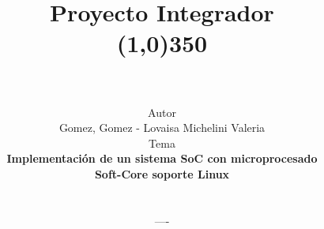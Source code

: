 \documentclass[a4paper,12pt]{report}
\begin{document}
\title{\vspace{-4cm} \textbf{Proyecto Integrador \\ \line(1,0){350}}\\
  \vspace{0.5cm}\\}
\author{\vspace{-0.25cm} Autor \vspace{0.25cm}\\ Gomez, Gomez - Lovaisa Michelini Valeria \bigskip \bigskip \bigskip \\
  Tema \vspace{0.25cm} \\ \textbf{Implementación de un sistema SoC con microprocesado  }\\ \textbf{ Soft-Core soporte Linux} \\ \textbf{} \bigskip \bigskip \bigskip \bigskip\\
  \begin{normalsize}---- \bigskip \bigskip \end{normalsize}\\ }
\date{}
\end{document}
